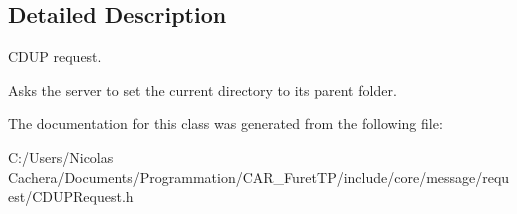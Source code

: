 \subsection{Detailed Description}
C\+D\+U\+P request. 

Asks the server to set the current directory to its parent folder. 

The documentation for this class was generated from the following file\+:\begin{DoxyCompactItemize}
\item 
C\+:/\+Users/\+Nicolas Cachera/\+Documents/\+Programmation/\+C\+A\+R\+\_\+\+Furet\+T\+P/include/core/message/request/C\+D\+U\+P\+Request.\+h\end{DoxyCompactItemize}
